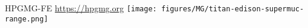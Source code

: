 \begin{frame}{HPGMG-FE \quad \url{https://hpgmg.org}}
  \texttt{[image: figures/MG/titan-edison-supermuc-range.png]}
\end{frame}
